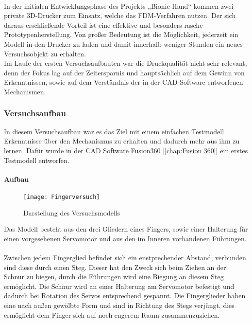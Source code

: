 \documentclass[titlepage,12pt,twoside]{article}
\begin{document}
\\
In der initialen Entwicklungsphase des Projekts „Bionic-Hand“ kommen zwei private 3D-Drucker zum Einsatz, welche das FDM-Verfahren nutzen. Der sich daraus erschließende 
Vorteil ist eine effektive und besonders rasche Prototypenherstellung. Von großer 
Bedeutung ist die Möglichkeit, jederzeit ein Modell in den Drucker zu laden und damit 
innerhalb weniger Stunden ein neues Versuchsobjekt zu erhalten. \\
Im Laufe der ersten Versuchsaufbauten war die Druckqualität nicht sehr relevant, denn 
der Fokus lag auf der Zeitersparnis und hauptsächlich auf dem Gewinn von Erkenntnissen, 
sowie auf dem Verständnis der in der CAD-Software entworfenen Mechanismen. \\

\subsubsection{Versuchsaufbau}
\label{chap:Versuchsaufbauten}
In diesem Versuchsaufbau war es das Ziel mit einem einfachen Testmodell Erkenntnisse über 
den Mechanismus zu erhalten und dadurch mehr aus ihm zu lernen. 
Dafür wurde in der CAD Software Fusion360 [\textcolor{blue}{\autoref{chap:Fusion 360}}] ein erstes Testmodell entworfen. \\

\paragraph{Aufbau}
\hfill \break
\hfill \break
\begin{figure}[H]
	\begin{center}
		\scalebox{0.8}
		{\texttt{[image: Fingerversuch]}}
		\caption{Darstellung des Versuchsmodells}
		\label{fig:Fingerversuch}		
	\end{center}
\end{figure}
\hfill \break
Das Modell besteht aus den drei Gliedern eines Fingers, sowie einer Halterung für einen vorgesehenen
Servomotor und aus den im Inneren vorhandenen Führungen. \\
\\
Zwischen jedem Fingerglied befindet sich ein enstprechender Abstand, verbunden sind diese durch einen Steg. Dieser hat den Zweck sich beim Ziehen an der Schnur zu biegen, durch 
die Führungen wird eine Biegung an diesem Steg ermöglicht. Die Schnur wird an einer Halterung am Servomotor befestigt und dadurch bei Rotation des Servos 
entsprechend gespannt. Die Fingerglieder haben eine nach außen gewölbte Form und sind 
in Richtung des Stegs verjüngt, dies ermöglicht dem Finger sich auf noch engerem Raum 
zusammenzuziehen.
\end{document}
